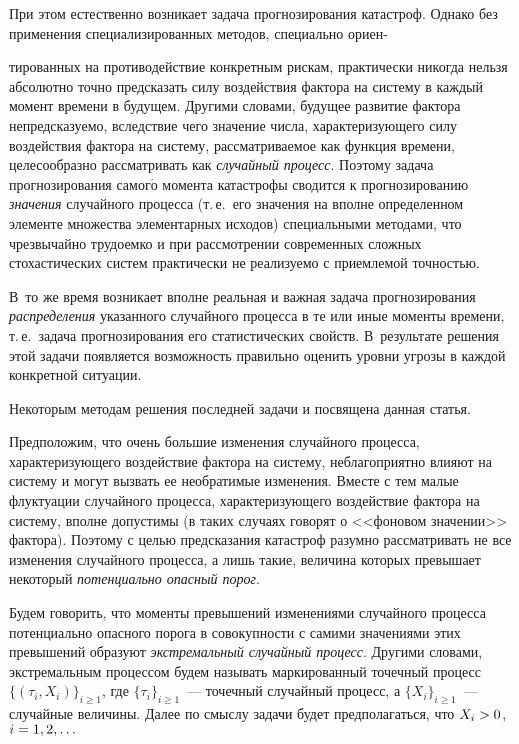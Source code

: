 \begin{multicols}{2}
При этом естественно возникает задача прогнозирования катастроф.
Однако без применения специализированных методов, специально
ориен-\linebreak\vspace*{-12pt}

\pagebreak

\noindent
тированных на противодействие конкретным рискам, практически
никогда нельзя абсолютно точно предсказать силу воздействия фактора
на систему в каждый момент времени в будущем. Другими словами,
будущее развитие фактора непредсказуемо, вследствие чего значение
числа, характеризующего силу воздействия фактора на систему,
рас\-смат\-ри\-ва\-емое как функция времени, целесообразно рассматривать как
\textit{случайный процесс}. Поэтому задача прогнозирования самог$\acute{\mbox{о}}$
момента катастрофы сводится к прогнозированию \textit{значения}
случайного процесса (т.\,е.\ его значения на вполне определенном
элементе множества элементарных исходов) специальными методами, что
чрезвычайно трудоемко и при рассмотрении современных сложных
стохастических систем практически не реализуемо с приемлемой
точностью. 

В~то же время возникает вполне реальная и важная задача прогнозирования 
\textit{распределения} указанного случайного процесса в те или иные моменты 
времени, т.\,е.\ задача прогнозирования его статистических свойств. 
В~результате решения этой задачи появляется возможность правильно оценить 
уровни угрозы в каждой конкретной ситуации. 
{ %

}

Некоторым методам решения последней задачи и посвящена
данная статья.


Предположим, что очень большие изменения случайного процесса,
характеризующего воздействие фактора на систему, неблагоприятно
влияют на систему и могут вызвать ее необратимые изменения. Вместе с
тем малые флуктуации случайного процесса, характеризующего
воздействие фактора на систему, вполне допустимы (в таких случаях
говорят о <<фоновом значении>> фактора). Поэтому с целью
предсказания катастроф разумно рассматривать не все изменения
случайного процесса, а лишь такие, величина которых превышает
некоторый \textit{потенциально опасный порог}.

Будем говорить, что моменты превышений изменениями случайного процесса 
потенциально опасного порога в совокупности с самими значениями этих превышений 
образуют \textit{экстремальный случайный процесс}. Другими словами, экстремальным 
процессом будем называть маркированный точечный процесс $\{(\tau_i, 
X_i)\}_{i\geqslant1}$, где $\{\tau_i\}_{i\geqslant1}$~--- точечный случайный 
процесс, а $\{X_i\}_{i\geqslant1}$~--- случайные величины. Далее по смыслу 
задачи будет предполагаться, что $X_i\hm>0$, $i\hm=1,2,\ldots$


\end{multicols}
